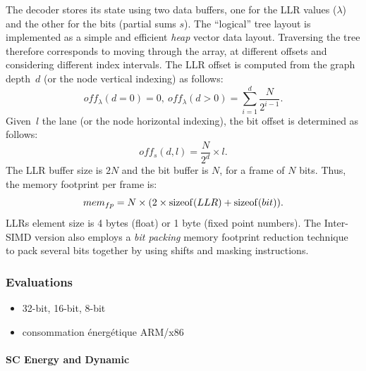 The decoder stores its state using two data buffers, one for the LLR values
($\lambda$) and the other for the bits (partial sums $s$). The ``logical'' tree
layout is implemented as a simple and efficient \emph{heap} vector data layout.
Traversing the tree therefore corresponds to moving through the array, at
different offsets and considering different index intervals. The LLR offset is
computed from the graph depth~$d$ (or the node vertical indexing) as follows:
\begin{equation}
  off_{\lambda}(d = 0) = 0,~off_{\lambda}(d > 0) =
  \sum\limits_{i = 1}^{d} \frac{N}{2^{i-1}}.
\end{equation}
Given~$l$ the lane (or the node horizontal indexing), the bit offset is
determined as follows:
\begin{equation}
  off_{s}(d,l) = \frac{N}{2^d} \times l.
\end{equation}
The LLR buffer size is $2N$ and the bit buffer is $N$, for a frame of $N$ bits.
Thus, the memory footprint per frame is:
\begin{equation}
  mem_{fp} = N \times (2 \times \operatorname*{sizeof}(LLR) + \operatorname*{sizeof}(bit)).
\end{equation}
LLRs element size is 4 bytes (float) or 1 byte (fixed point numbers). The
Inter-SIMD version also employs a \emph{bit packing} memory footprint reduction
technique~\cite{LeGal2015a} to pack several bits together by using shifts and
masking instructions.

\subsubsection{Evaluations}

\begin{itemize}
  \item 32-bit, 16-bit, 8-bit
  \item consommation énergétique ARM/x86
\end{itemize}

\paragraph{SC Energy and Dynamic}

